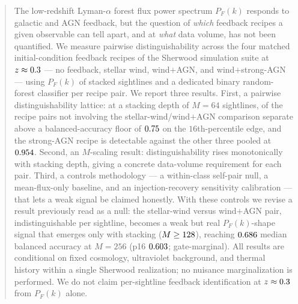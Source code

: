 \begin{abstract}
The low-redshift Lyman-$\alpha$ forest flux power spectrum $P_F(k)$ responds to
galactic and AGN feedback, but the question of \emph{which} feedback recipes a
given observable can tell apart, and at \emph{what} data volume, has not been
quantified. We measure pairwise distinguishability across the four matched
initial-condition feedback recipes of the Sherwood simulation suite at
$z\approx\zsnap$ --- no feedback, stellar wind, wind${+}$AGN, and
wind${+}$strong-AGN --- using $P_F(k)$ of stacked sightlines and a dedicated
binary random-forest classifier per recipe pair. We report three results. First,
a pairwise distinguishability lattice: at a stacking depth of $M=64$ sightlines,
\latClearedTotal{} of the \latClearedTotal{} recipe pairs not involving the
stellar-wind/wind${+}$AGN comparison separate above a balanced-accuracy floor of
$\latQualBar$ on the $16$th-percentile edge, and the strong-AGN recipe is
detectable against the other three pooled at $\latCdRest$. Second, an
$M$-scaling result: distinguishability rises monotonically with stacking depth,
giving a concrete data-volume requirement for each pair. Third, a controls
methodology --- a within-class self-pair null, a mean-flux-only baseline, and an
injection-recovery sensitivity calibration --- that lets a weak signal be claimed
honestly. With these controls we revise a result previously read as a null: the
stellar-wind versus wind${+}$AGN pair, indistinguishable per sightline, becomes a
weak but real $P_F(k)$-shape signal that emerges only with stacking
($M\geq\hbcMmin$), reaching $\hbcMtwofivesix$ median balanced accuracy at $M=256$
(p16 $\hbcMtwofivesixPsixteen$; gate-marginal). All results are conditional on
fixed cosmology, ultraviolet background, and thermal history within a single
Sherwood realization; no nuisance marginalization is performed. We do not claim
per-sightline feedback identification at $z\approx\zsnap$ from $P_F(k)$ alone.
\end{abstract}
